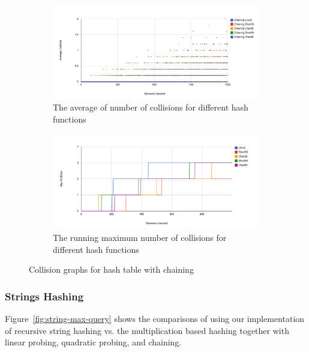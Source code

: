 \documentclass[11pt]{article}
\begin{document}
\begin{figure}
        \begin{subfigure}[b]{1\textwidth}
                \centering
                \includegraphics[width=\textwidth]{chaining-collision.png}
                \caption{The average of number of collisions for different hash functions}
                \label{fig:chaining-collision}
        \end{subfigure}

         \begin{subfigure}[b]{1\textwidth}
                \centering
                \includegraphics[width=\textwidth]{max-query-chaining.png}
                \caption{The running maximum number of collisions for different hash functions}
                \label{fig:chaining-max}
        \end{subfigure}
        \caption{Collision graphs for hash table with chaining}\label{fig:chaining}
\end{figure}

\subsubsection{Strings Hashing}
Figure~\ref{fig:string-max-query} shows the comparisons of using our implementation of recursive string hashing vs. the multiplication based hashing together with linear probing, quadratic probing, and chaining.
\end{document}
